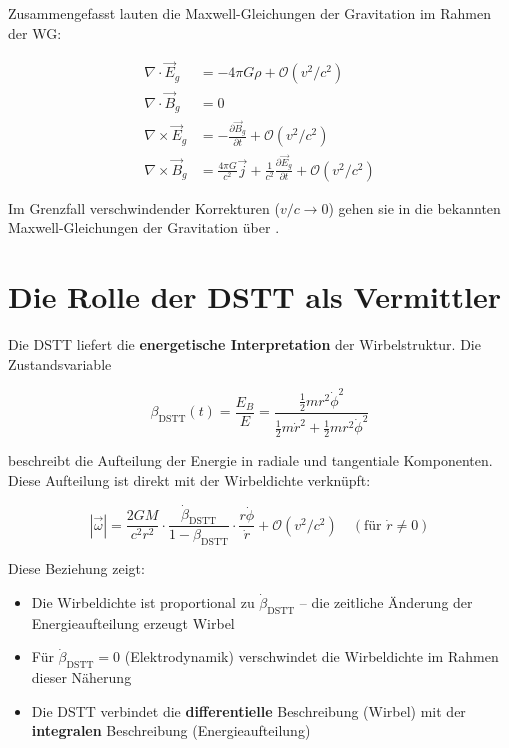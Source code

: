 \documentclass[12pt,a4paper]{article}
\begin{document}
Zusammengefasst lauten die Maxwell-Gleichungen der Gravitation im Rahmen der WG:

\begin{align}
\nabla \cdot \vec{E}_g &= -4\pi G \rho + \mathcal{O}(v^2/c^2) \label{eq:mg1}\\
\nabla \cdot \vec{B}_g &= 0 \label{eq:mg2}\\
\nabla \times \vec{E}_g &= -\frac{\partial \vec{B}_g}{\partial t} + \mathcal{O}(v^2/c^2) \label{eq:mg3}\\
\nabla \times \vec{B}_g &= \frac{4\pi G}{c^2} \vec{j} + \frac{1}{c^2} \frac{\partial \vec{E}_g}{\partial t} + \mathcal{O}(v^2/c^2) \label{eq:mg4}
\end{align}

Im Grenzfall verschwindender Korrekturen (\(v/c \to 0\)) gehen sie in die bekannten Maxwell-Gleichungen der Gravitation über \cite{heaviside1893}.

\section{Die Rolle der DSTT als Vermittler}

Die DSTT liefert die \textbf{energetische Interpretation} der Wirbelstruktur. Die Zustandsvariable

\begin{equation}
\beta_{\text{DSTT}}(t) = \frac{E_B}{E} = \frac{\frac{1}{2}m r^2\dot{\phi}^2}{\frac{1}{2}m\dot{r}^2 + \frac{1}{2}m r^2\dot{\phi}^2}
\label{eq:beta_dstt}
\end{equation}

beschreibt die Aufteilung der Energie in radiale und tangentiale Komponenten. Diese Aufteilung ist direkt mit der Wirbeldichte verknüpft:

\begin{equation}
|\vec{\omega}| = \frac{2GM}{c^2 r^2} \cdot \frac{\dot{\beta}_{\text{DSTT}}}{1-\beta_{\text{DSTT}}} \cdot \frac{r\dot{\phi}}{\dot{r}} + \mathcal{O}(v^2/c^2) \quad (\text{für } \dot{r} \neq 0)
\label{eq:omega_beta}
\end{equation}

Diese Beziehung zeigt:

\begin{itemize}
    \item Die Wirbeldichte ist proportional zu \(\dot{\beta}_{\text{DSTT}}\) – die zeitliche Änderung der Energieaufteilung erzeugt Wirbel
    \item Für \(\dot{\beta}_{\text{DSTT}} = 0\) (Elektrodynamik) verschwindet die Wirbeldichte im Rahmen dieser Näherung
    \item Die DSTT verbindet die \textbf{differentielle} Beschreibung (Wirbel) mit der \textbf{integralen} Beschreibung (Energieaufteilung)
\end{itemize}
\end{document}
